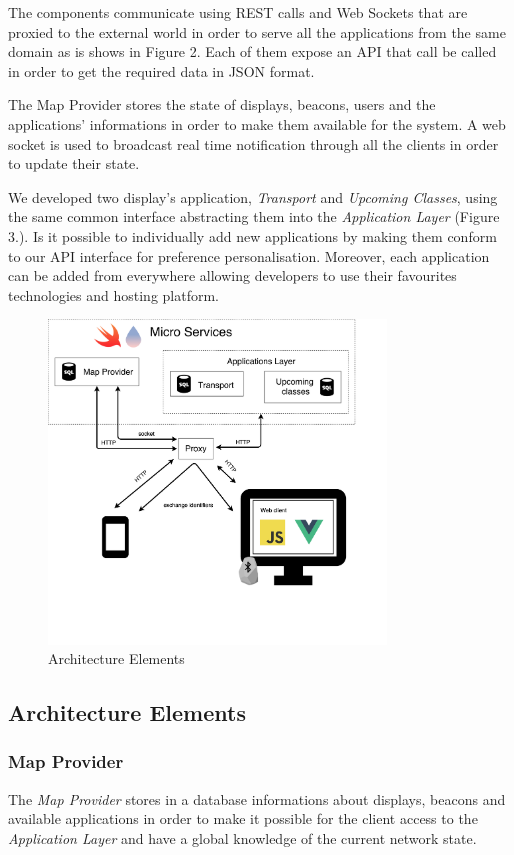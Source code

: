 \documentclass[]{usiinfbachelorproject}
\begin{document}
The components communicate using REST calls and Web Sockets that are proxied to the external world in order to serve all the applications from the same domain as is shows in Figure 2. Each of them expose an API that call be called in order to get the required data in JSON format.

The Map Provider stores the state of displays, beacons, users and the applications' informations in order to make them available for the system. A web socket is used to broadcast real time notification through all the clients in order to update their state.

We developed two display's application, \emph{Transport} and \emph{Upcoming Classes}, using the same common interface abstracting them into the \emph{Application Layer} (Figure 3.). Is it possible to individually add new applications by making them conform to our API interface for preference personalisation. Moreover, each application can be added from everywhere allowing developers to use their favourites technologies and hosting platform.
\begin{figure}[H]
  \centering
  \includegraphics[width=0.8\textwidth]{./images/poster_image_1.png}
    \caption{Architecture Elements}
\end{figure} 


%
\subsection{Architecture Elements}
\subsubsection{Map Provider}
The \emph{Map Provider} stores in a database informations about displays, beacons and available applications in order to make it possible for the client access to the \emph{Application Layer} and have a global knowledge of the current network state. 
\end{document}
